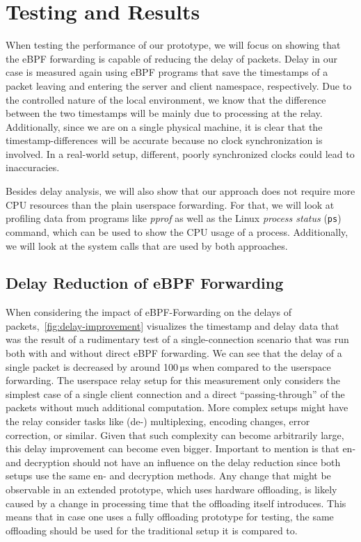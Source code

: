\section{Testing and Results}\label{sec:testing_and_results}
When testing the performance of our prototype, we will focus on showing that the eBPF forwarding
is capable of reducing the delay of packets.
Delay in our case is measured again using eBPF programs that save the timestamps of a packet 
leaving and entering the server and client namespace, respectively.
Due to the controlled nature of the local environment, we know that the difference 
between the two timestamps will be mainly due to processing at the relay.
Additionally, since we are on a single physical machine, it is clear that the timestamp-differences
will be accurate because no clock synchronization is involved.
In a real-world setup, different, poorly synchronized clocks could lead to inaccuracies.

Besides delay analysis, we will also show that our approach does not require more CPU resources than the plain userspace forwarding.
For that, we will look at profiling data from programs like \textit{pprof} %
as well as the Linux \textit{process status} (\verb|ps|) command, which can be used to 
show the CPU usage of a process. %
Additionally, we will look at the system calls that are used by both approaches.

\subsection{Delay Reduction of eBPF Forwarding}
When considering the impact of eBPF-Forwarding on the delays of packets,~\autoref{fig:delay-improvement}
visualizes the timestamp and delay data that was the result of a rudimentary test of a single-connection 
scenario that was run both with and without direct eBPF forwarding.
We can see that the delay of a single packet is decreased by around 100\,µs
when compared to the userspace forwarding. 
The userspace relay setup for this measurement only considers the simplest case of a single client connection 
and a direct ``passing-through'' of the packets without much additional computation.
More complex setups might have the relay consider tasks like (de-) multiplexing, 
encoding changes, error correction, or similar. 
Given that such complexity can become arbitrarily large, this delay improvement can become even bigger.
Important to mention is that en- and decryption should not have an influence on the delay 
reduction since both setups use the same en- and decryption methods.
Any change that might be observable in an extended prototype, which uses hardware offloading,
is likely caused by a change in processing time that the offloading itself introduces.
This means that in case one uses a fully offloading prototype for testing, the same offloading
should be used for the traditional setup it is compared to.

